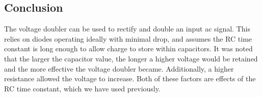 \documentclass{report}
\begin{document}
\subsection{Conclusion}
The voltage doubler can be used to rectify and double an input ac signal. This relies on diodes operating ideally with minimal drop, and assumes the RC time constant is long enough to allow charge to store within capacitors. It was noted that the larger the capacitor value, the longer a higher voltage would be retained and the more effective the voltage doubler became. Additionally, a higher resistance allowed the voltage to increase. Both of these factors are effects of the RC time constant, which we have used previously.
\end{document}
